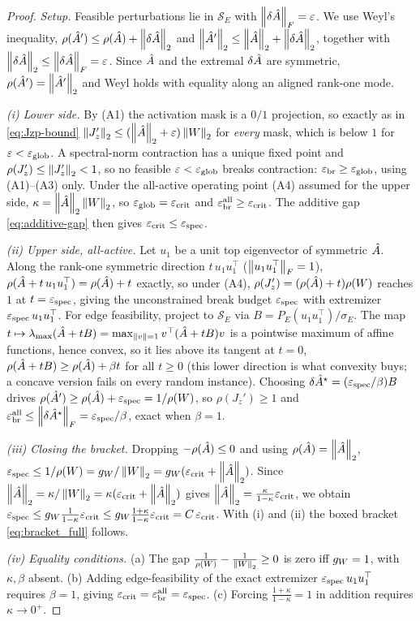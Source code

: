 \begin{proof}
\emph{Setup.} Feasible perturbations lie in $\mathcal S_E$ with $\left\|\delta\hat{A}\right\|_F=\varepsilon$. We
use Weyl's inequality, $\rho(\hat{A}')\le\rho(\hat{A})+\left\|\delta\hat{A}\right\|_2$ and
$\left\|\hat{A}'\right\|_2\le\left\|\hat{A}\right\|_2+\left\|\delta\hat{A}\right\|_2$, together with
$\left\|\delta\hat{A}\right\|_2\le\left\|\delta\hat{A}\right\|_F=\varepsilon$. Since $\hat{A}$ and the extremal $\delta\hat{A}$
are symmetric, $\rho(\hat{A}')=\left\|\hat{A}'\right\|_2$ and Weyl holds with equality along an aligned rank-one
mode.

\emph{(i) Lower side.} By (A1) the activation mask is a $0/1$ projection, so exactly as in
\eqref{eq:Jzp-bound} $\left\|J_z'\right\|_2\le(\left\|\hat{A}\right\|_2+\varepsilon)\left\|W\right\|_2$ for \emph{every} mask, which
is below $1$ for $\varepsilon<\varepsilon_{\mathrm{glob}}$. A spectral-norm contraction has a unique fixed point and
$\rho(J_z')\le\left\|J_z'\right\|_2<1$, so no feasible $\varepsilon<\varepsilon_{\mathrm{glob}}$ breaks contraction: $\varepsilon_{\mathrm{br}}\ge\varepsilon_{\mathrm{glob}}$,
using (A1)--(A3) only. Under the all-active operating point (A4) assumed for the upper side,
$\kappa=\left\|\hat{A}\right\|_2\left\|W\right\|_2$, so $\varepsilon_{\mathrm{glob}}=\varepsilon_{\mathrm{crit}}$ and $\varepsilon_{\mathrm{br}}^{\mathrm{all}}\ge\varepsilon_{\mathrm{crit}}$. The additive gap
\eqref{eq:additive-gap} then gives $\varepsilon_{\mathrm{crit}}\le\varepsilon_{\mathrm{spec}}$.

\emph{(ii) Upper side, all-active.} Let $u_1$ be a unit top eigenvector of symmetric $\hat{A}$. Along the
rank-one symmetric direction $t\,u_1u_1^\top$ ($\left\|u_1u_1^\top\right\|_F=1$), $\rho(\hat{A}+t\,u_1u_1^\top)=\rho(\hat{A})+t$
exactly, so under (A4), $\rho(J_z')=(\rho(\hat{A})+t)\rho(W)$ reaches $1$ at $t=\varepsilon_{\mathrm{spec}}$, giving the
unconstrained break budget $\varepsilon_{\mathrm{spec}}$ with extremizer $\varepsilon_{\mathrm{spec}}\,u_1u_1^\top$. For edge feasibility, project
to $\mathcal S_E$ via $B=P_E(u_1u_1^\top)/\sigma_E$. The map
$t\mapsto\lambda_{\max}(\hat{A}+tB)=\max_{\left\|v\right\|=1}v^\top(\hat{A}+tB)v$ is a pointwise maximum of affine
functions, hence convex, so it lies above its tangent at $t=0$,
$\rho(\hat{A}+tB)\ge\rho(\hat{A})+\beta t$ for all $t\ge0$ (this lower direction is what convexity buys; a
concave version fails on every random instance). Choosing $\delta\hat{A}^\star=(\varepsilon_{\mathrm{spec}}/\beta)B$ drives
$\rho(\hat{A}')\ge\rho(\hat{A})+\varepsilon_{\mathrm{spec}}=1/\rho(W)$, so $\rho(J_z')\ge1$ and
$\varepsilon_{\mathrm{br}}^{\mathrm{all}}\le\left\|\delta\hat{A}^\star\right\|_F=\varepsilon_{\mathrm{spec}}/\beta$, exact when $\beta=1$.

\emph{(iii) Closing the bracket.} Dropping $-\rho(\hat{A})\le0$ and using $\rho(\hat{A})=\left\|\hat{A}\right\|_2$,
$\varepsilon_{\mathrm{spec}}\le1/\rho(W)=g_W/\left\|W\right\|_2=g_W(\varepsilon_{\mathrm{crit}}+\left\|\hat{A}\right\|_2)$. Since
$\left\|\hat{A}\right\|_2=\kappa/\left\|W\right\|_2=\kappa(\varepsilon_{\mathrm{crit}}+\left\|\hat{A}\right\|_2)$ gives
$\left\|\hat{A}\right\|_2=\tfrac{\kappa}{1-\kappa}\varepsilon_{\mathrm{crit}}$, we obtain
$\varepsilon_{\mathrm{spec}}\le g_W\tfrac{1}{1-\kappa}\varepsilon_{\mathrm{crit}}\le g_W\tfrac{1+\kappa}{1-\kappa}\varepsilon_{\mathrm{crit}}=C\,\varepsilon_{\mathrm{crit}}$. With (i) and
(ii) the boxed bracket \eqref{eq:bracket_full} follows.

\emph{(iv) Equality conditions.} (a) The gap $\tfrac{1}{\rho(W)}-\tfrac{1}{\left\|W\right\|_2}\ge0$ is zero iff
$g_W=1$, with $\kappa,\beta$ absent. (b) Adding edge-feasibility of the exact extremizer
$\varepsilon_{\mathrm{spec}}\,u_1u_1^\top$ requires $\beta=1$, giving $\varepsilon_{\mathrm{crit}}=\varepsilon_{\mathrm{br}}^{\mathrm{all}}=\varepsilon_{\mathrm{spec}}$. (c) Forcing
$\tfrac{1+\kappa}{1-\kappa}=1$ in addition requires $\kappa\to0^+$.
\end{proof}

